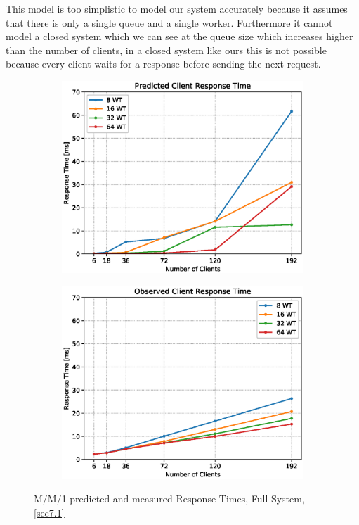 \documentclass[11pt,a4paper]{article}
\begin{document}
This model is too simplistic to model our system accurately because it assumes that there is only a single queue and a single worker. Furthermore it cannot model a closed system which we can see at the queue size which increases higher than the number of clients, in a closed system like ours this is not possible because every client waits for a response before sending the next request.

\begin{figure}
    \begin{subfigure}{.4\textwidth}
        \includegraphics[width=1\linewidth]{plots/7_MM1_ResponseTimePredicted.eps}
    \end{subfigure}
    \begin{subfigure}{.4\textwidth}
        \includegraphics[width=1\linewidth]{plots/7_MM1_ResponseTimeObserved.eps}
    \end{subfigure}
    \caption{M/M/1 predicted and measured Response Times, Full System, \autoref{sec7.1}}
    \label{fig:mm1-RT}
\end{figure}
\end{document}
